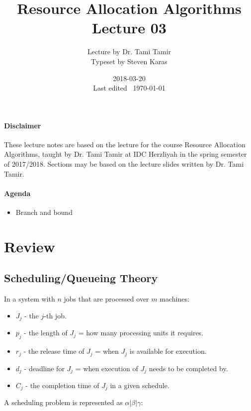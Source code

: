 \documentclass{idc_msc}
\title{Resource Allocation Algorithms\\\large Lecture 03}
\date{2018-03-20 \\ Last edited \currenttime\ \today}
\author{Lecture by Dr. Tami Tamir\\Typeset by Steven Karas}
\begin{document}
\maketitle

\nocite{pinedo2016scheduling}

\paragraph{Disclaimer}

These lecture notes are based on the lecture for the course Resource Allocation Algorithms, taught by Dr. Tami Tamir at IDC Herzliyah in the spring semester of 2017/2018.
Sections may be based on the lecture slides written by Dr. Tami Tamir.

\paragraph{Agenda}

\begin{itemize}
  \item Branch and bound
\end{itemize}

\section{Review}

\subsection{Scheduling/Queueing Theory}

In a system with \(n\) jobs that are processed over \(m\) machines:

\begin{itemize}
  \item \(J_j\) - the \(j\)-th job.
  \item \(p_j\) - the length of \(J_j\) = how many processing units it requires.
  \item \(r_j\) - the release time of \(J_j\) = when \(J_j\) is available for execution.
  \item \(d_j\) - deadline for \(J_j\) = when execution of \(J_j\) needs to be completed by.
  \item \(C_j\) - the completion time of \(J_j\) in a given schedule.
\end{itemize}

A scheduling problem is represented as \(\alpha | \beta | \gamma\):
\end{document}
